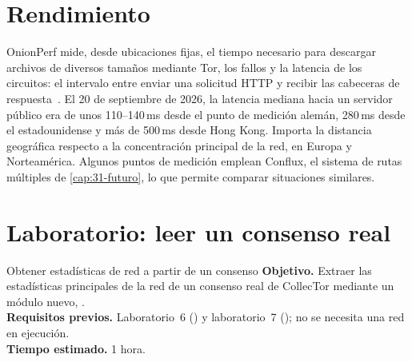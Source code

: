 \section{Rendimiento}\label{sec:metrics-prestazioni}

OnionPerf mide, desde ubicaciones fijas, el tiempo necesario para descargar archivos de diversos tamaños mediante Tor, los fallos y la latencia de los circuitos: el intervalo entre enviar una solicitud HTTP y recibir las cabeceras de respuesta~\cite{metricsreproducible}. El 20 de septiembre de 2026, la latencia mediana hacia un servidor público era de unos 110--140\,ms desde el punto de medición alemán, 280\,ms desde el estadounidense y más de 500\,ms desde Hong Kong. Importa la distancia geográfica respecto a la concentración principal de la red, en Europa y Norteamérica. Algunos puntos de medición emplean Conflux, el sistema de rutas múltiples de \cref{cap:31-futuro}, lo que permite comparar situaciones similares.

\section{Laboratorio: leer un consenso real}\label{sec:lab-metrics}

\begin{laboratorio}[15]{Obtener estadísticas de red a partir de un consenso}
\textbf{Objetivo.} Extraer las estadísticas principales de la red de un consenso real de CollecTor mediante un módulo nuevo, .\\
\textbf{Requisitos previos.} Laboratorio~6 () y laboratorio~7 (); no se necesita una red en ejecución.\\
\textbf{Tiempo estimado.} 1 hora.
\end{laboratorio}

